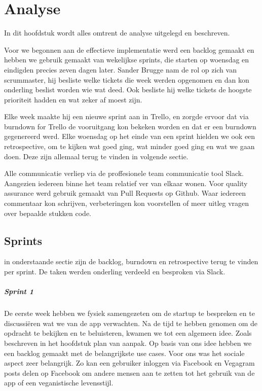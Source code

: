 \chapter{Analyse}
\label{ch:analyse}

In dit hoofdstuk wordt alles omtrent de analyse uitgelegd en beschreven. 

Voor we begonnen aan de effectieve implementatie werd een backlog gemaakt en hebben we gebruik gemaakt van wekelijkse sprints, die starten op woensdag en eindigden precies zeven dagen later. Sander Brugge nam de rol op zich van scrummaster, hij besliste welke tickets die week werden opgenomen en dan kon onderling beslist worden wie wat deed. Ook besliste hij welke tickets de hoogste prioriteit hadden en wat zeker af moest zijn.

Elke week maakte hij een nieuwe sprint aan in Trello, en zorgde ervoor dat via burndown for Trello de vooruitgang kon bekeken worden en dat er een burndown gegenereerd werd. Elke woensdag op het einde van een sprint hielden we ook een retrospective, om te kijken wat goed ging, wat minder goed ging en wat we gaan doen. Deze zijn allemaal terug te vinden in volgende sectie.

Alle communicatie verliep via de proffesionele team communicatie tool Slack. Aangezien iedereen binne het team relatief ver van elkaar wonen. Voor quality assurance werd gebruik gemaakt van Pull Requests op Github. Waar iedereen commentaar kon schrijven, verbeteringen kon voorstellen of meer uitleg vragen over bepaalde stukken code.

\section{Sprints}

in onderstaande sectie zijn de backlog, burndown en retrospective terug te vinden per sprint. De taken werden onderling verdeeld en besproken via Slack.

\paragraph{Sprint 1}
De eerste week hebben we fysiek samengezeten om de startup te bespreken en te discussiëren wat we van de app verwachten. Na de tijd te hebben genomen om de opdracht te bekijken en te beluisteren, kwamen we tot een algemeen idee. Zoals beschreven in het hoofdstuk plan van aanpak. Op basis van ons idee hebben we een backlog gemaakt met de belangrijkste use cases. Voor ons was het sociale aspect zeer belangrijk. Zo kan een gebruiker inloggen via Facebook en Vegagram posts delen op Facebook om andere mensen aan te zetten tot het gebruik van de app of een veganistische levensstijl.


